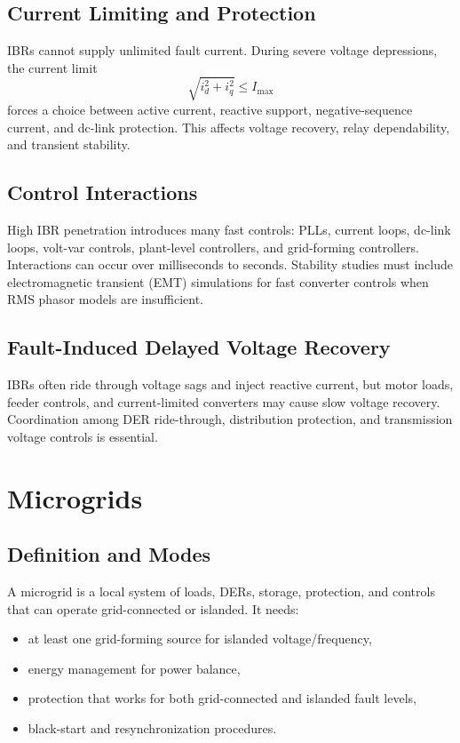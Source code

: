 \documentclass[11pt]{article}
\begin{document}
\subsection{Current Limiting and Protection}
IBRs cannot supply unlimited fault current. During severe voltage depressions,
the current limit
\begin{equation}
\sqrt{i_d^2+i_q^2}\le I_{\max}
\end{equation}
forces a choice between active current, reactive support, negative-sequence
current, and dc-link protection. This affects voltage recovery, relay
dependability, and transient stability.

\subsection{Control Interactions}
High IBR penetration introduces many fast controls: PLLs, current loops, dc-link
loops, volt-var controls, plant-level controllers, and grid-forming controllers.
Interactions can occur over milliseconds to seconds. Stability studies must
include electromagnetic transient (EMT) simulations for fast converter controls
when RMS phasor models are insufficient.

\subsection{Fault-Induced Delayed Voltage Recovery}
IBRs often ride through voltage sags and inject reactive current, but motor loads,
feeder controls, and current-limited converters may cause slow voltage recovery.
Coordination among DER ride-through, distribution protection, and transmission
voltage controls is essential.

\section{Microgrids}

\subsection{Definition and Modes}
A microgrid is a local system of loads, DERs, storage, protection, and controls
that can operate grid-connected or islanded. It needs:
\begin{itemize}
  \item at least one grid-forming source for islanded voltage/frequency,
  \item energy management for power balance,
  \item protection that works for both grid-connected and islanded fault levels,
  \item black-start and resynchronization procedures.
\end{itemize}
\end{document}
